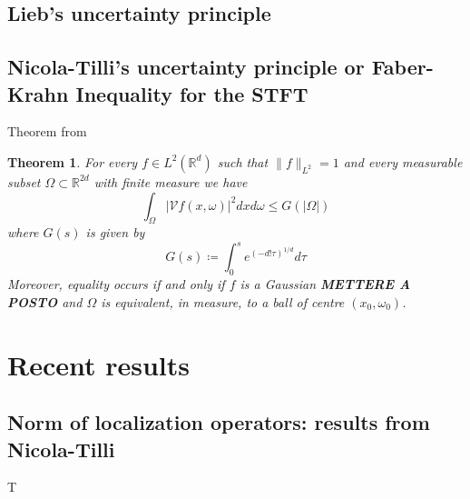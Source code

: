 \documentclass[corpo=11pt, stile=classica, tipotesi=custom,
greek, evenboxes, english]{toptesi}
\numberwithin{equation}{chapter}
\newtheorem{teo}{Theorem}[chapter] %
\newcommand{\R}{\mathbb{R}} %
\newcommand{\V}{\mathcal{V}} %
\newcommand{\dxdo}{dxd\omega}
\begin{document}
\section{Lieb's uncertainty principle}\label{section Lieb's UP}
\section{Nicola-Tilli's uncertainty principle or Faber-Krahn Inequality for the STFT}\label{section Faber-Krahn inequality fot STFT}
Theorem from \cite{nicolatilli_fk}
\begin{teo}\label{faberkrahn theorem}
	For every $f \in L^2(\R^d)$ such that $\|f\|_{L^2} = 1$ and every measurable subset $\Omega \subset \R^{2d}$ with finite measure we have
	\begin{equation*}
		\int_{\Omega}  |\V f(x,\omega)|^2 \dxdo \leq G(|\Omega|)
	\end{equation*}
	where $G(s)$ is given by
	\begin{equation}\label{G}
		G(s) \coloneqq \int_0^s e^{\left(-d!\tau\right)^{1/d}} d\tau
	\end{equation}
	Moreover, equality occurs if and only if $f$ is a Gaussian \textbf{METTERE A POSTO} and $\Omega$ is equivalent, in measure, to a ball of centre $(x_0,\omega_0)$.
\end{teo}

\chapter{Recent results}\label{chapter recent results}
\section{Norm of localization operators: results from Nicola-Tilli}\label{section norm of localization operators}
T
\end{document}
